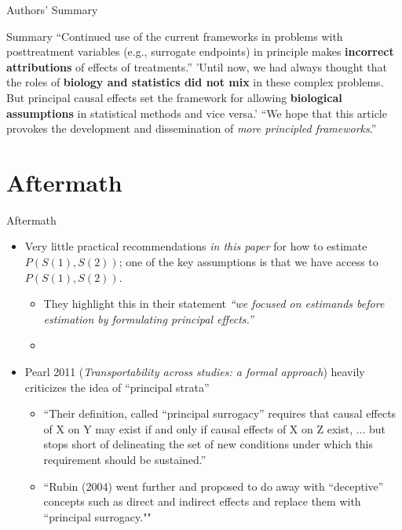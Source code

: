\documentclass[10pt]{beamer}
\begin{document}
\begin{frame}{Authors' Summary}

\begin{block}{Summary} 
``Continued use of the current frameworks in problems with posttreatment
variables (e.g., surrogate endpoints) in principle makes \textcolor{orange!80!black!100}{\textbf{incorrect
attributions}} of effects of treatments.'' \newline \newline 'Until now, we had always thought that the roles of \textbf{biology 
and statistics did not mix} in these complex problems. But principal 
causal effects set the framework for allowing \textbf{biological assumptions} in statistical
methods and vice versa.' \newline \newline
``We hope that this article provokes the development and dissemination
of \emph{more principled frameworks}.''
\end{block}

\end{frame}

\section{Aftermath} 

\begin{frame}{Aftermath}
\begin{itemize}
    \item Very little practical recommendations \textit{in this paper} for how to estimate 
    $P(S(1), S(2))$; one of the key assumptions is that we have 
    access to $P(S(1), S(2))$. 
    \begin{itemize}
    \item {\footnotesize They highlight this in their statement 
    \textit{``we focused on estimands before estimation by formulating principal effects.''}}
    \item {\footnotesize }
    \end{itemize}
    \item Pearl 2011 (\textit{Transportability across studies: a formal approach}) heavily criticizes the idea of ``principal strata''
    \begin{itemize}
        \item {\footnotesize ``Their definition, called “principal surrogacy” requires
that causal effects of X on Y may exist if and only if causal effects of X on Z exist, ... but stops short of delineating the set of new
conditions under which this requirement should be sustained.''}
        \item {\footnotesize ``Rubin (2004) went further and proposed to do away with “deceptive” concepts such as direct and indirect
effects and replace them with “principal surrogacy.""}
    \end{itemize}
\end{itemize}
\end{frame}
\end{document}

